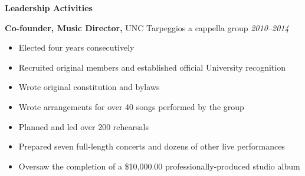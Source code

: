 \documentclass{article}
\newcommand{\bulletedList}[1]{
  \begin{itemize}[leftmargin=*] \itemsep -6pt
    #1
  \end{itemize}
}
\newcommand{\dateStyle}[1]{\textit{#1}}
\newcommand{\jobExperience}[4]{
  {\bf #1,} #2 \hfill \dateStyle{#3}
  \vspace{-6pt}
  \bulletedList{#4}
}
\newcommand{\leadershipExperience}[4]{\jobExperience{#1}{#2}{#3}{#4}}
\newcommand{\resumeSection}[2]{
  {\bf #1}
  
  #2
  
  \vspace{-8pt}\hrulefill\vspace{-4pt}
}
\begin{document}

\resumeSection{Leadership Activities}{
  \leadershipExperience{Co-founder, Music Director}{UNC Tarpeggios a cappella group}{2010--2014}{
    \item Elected four years consecutively
    \item Recruited original members and established official University recognition
    \item Wrote original constitution and bylaws
    \item Wrote arrangements for over 40 songs performed by the group
    \item Planned and led over 200 rehearsals
    \item Prepared seven full-length concerts and dozens of other live performances
    \item Oversaw the completion of a \$10,000.00 professionally-produced studio album
  }
}

\end{document}
